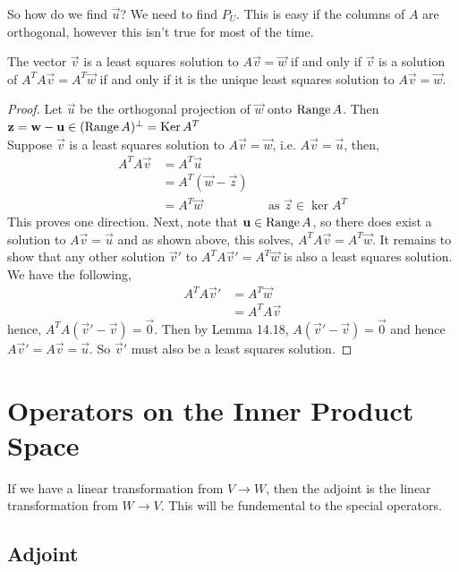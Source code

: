 \documentclass{article}
\begin{document}
So how do we find $\vec u$? We need to find $P_U$. This is easy if the columns of $A$ are orthogonal, however this isn't true for most of the time.

\begin{nthm}
  The vector $\vec v$ is a least squares solution to $A\vec v = \vec w$ if and only if $\vec v$ is a solution of $A^TA\vec v = A^T\vec w$ if and only if it is the unique least squares solution to $A\vec v = \vec w$.
\end{nthm}

\begin{proof}
  Let $\vec u$ be the orthogonal projection of $\vec w$ onto $\operatorname{Range} A$. Then $\boldsymbol{\mathbf{z}} = \boldsymbol{\mathbf{w}} - \boldsymbol{\mathbf{u}} \in (\operatorname{Range} A)^\bot = \operatorname{Ker} A^T$\\

  \noindent
  Suppose $\vec v$ is a least squares solution to $A\vec v = \vec w$, i.e. $A\vec v = \vec u$, then,
  \begin{align*}
    A^TA \vec v &= A^T\vec u\\
    &= A^T(\vec w - \vec z)\\
    &= A^T\vec w && \text{as $\vec z \in \ker A^T$}
  \end{align*}
  This proves one direction. Next, note that $\boldsymbol{\mathbf{u}} \in \operatorname{Range} A$, so there does exist a solution to $A\vec v = \vec u$ and as shown above, this solves, $A^TA\vec v = A^T\vec w$. It remains to show that any other solution $\vec v'$ to $A^TA\vec v' = A^T\vec w$ is also a least squares solution. We have the following,
  \begin{align*}
    A^TA\vec v' &= A^T\vec w\\
    &= A^TA\vec v
  \end{align*}
  hence, $A^TA(\vec v' - \vec v) = \vec 0$. Then by Lemma 14.18, $A(\vec v' - \vec v) = \vec 0$ and hence $A\vec v' = A\vec v = \vec u$. So $\vec v'$ must also be a least squares solution.
\end{proof}

\section{Operators on the Inner Product Space}

If we have a linear transformation from $V \to W$, then the adjoint is the linear transformation from $W \to V$. This will be fundemental to the special operators.

\subsection{Adjoint}
\end{document}
